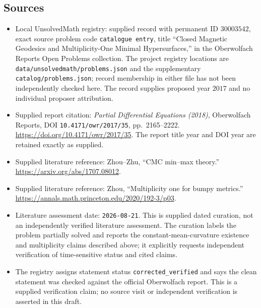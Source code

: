 \documentclass[11pt]{article}
\begin{document}
\subsection{Sources}
\begin{itemize}
\item Local UnsolvedMath registry: supplied record with permanent ID \(30003542\), exact source problem code \texttt{catalogue entry}, title ``Closed Magnetic Geodesics and Multiplicity-One Minimal Hypersurfaces,'' in the Oberwolfach Reports Open Problems collection. The project registry locations are \texttt{data/unsolvedmath/problems.json} and the supplementary \texttt{catalog/problems.json}; record membership in either file has not been independently checked here. The record supplies proposed year \(2017\) and no individual proposer attribution.
\item Supplied report citation: \emph{Partial Differential Equations (2018)}, Oberwolfach Reports, DOI \texttt{10.4171/owr/2017/35}, pp.\ 2165--2222. \url{https://doi.org/10.4171/owr/2017/35}. The report title year and DOI year are retained exactly as supplied.
\item Supplied literature reference: Zhou--Zhu, ``CMC min--max theory.'' \url{https://arxiv.org/abs/1707.08012}.
\item Supplied literature reference: Zhou, ``Multiplicity one for bumpy metrics.'' \url{https://annals.math.princeton.edu/2020/192-3/p03}.
\item Literature assessment date: \texttt{2026-08-21}. This is supplied dated curation, not an independently verified literature assessment. The curation labels the problem partially solved and reports the constant-mean-curvature existence and multiplicity claims described above; it explicitly requests independent verification of time-sensitive status and cited claims.
\item The registry assigns statement status \texttt{corrected\_verified} and says the clean statement was checked against the official Oberwolfach report. This is a supplied verification claim; no source visit or independent verification is asserted in this draft.
\end{itemize}
\end{document}
